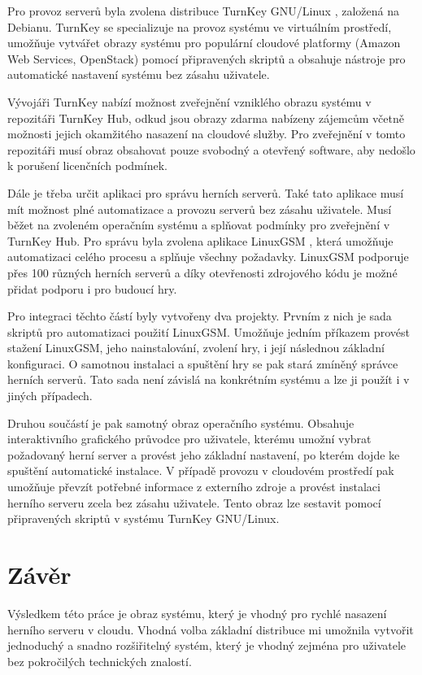 \documentclass{article}
\begin{document}
Pro provoz serverů byla zvolena distribuce TurnKey GNU/Linux \cite{turnkey}, založená na Debianu. TurnKey se specializuje na provoz systému ve virtuálním prostředí,
umožňuje vytvářet obrazy systému pro populární cloudové platformy (Amazon Web Services, OpenStack) pomocí připravených skriptů a obsahuje
nástroje pro automatické nastavení systému bez zásahu uživatele.

Vývojáři TurnKey nabízí možnost zveřejnění vzniklého obrazu systému v repozitáři TurnKey Hub, odkud jsou obrazy zdarma nabízeny zájemcům
včetně možnosti jejich okamžitého nasazení na cloudové služby. Pro zveřejnění v tomto repozitáři musí obraz obsahovat pouze svobodný a otevřený
software, aby nedošlo k porušení licenčních podmínek.

Dále je třeba určit aplikaci pro správu herních serverů. Také tato aplikace musí mít možnost plné automatizace a provozu serverů bez zásahu uživatele.
Musí běžet na zvoleném operačním systému a splňovat podmínky pro zveřejnění v TurnKey Hub. Pro správu byla zvolena aplikace LinuxGSM \cite{linuxgsm}, která umožňuje
automatizaci celého procesu a splňuje všechny požadavky. LinuxGSM podporuje přes 100 různých herních serverů a díky otevřenosti zdrojového kódu je možné přidat podporu
i pro budoucí hry.

Pro integraci těchto částí byly vytvořeny dva projekty. Prvním z nich je sada skriptů pro automatizaci použití LinuxGSM. Umožňuje jedním příkazem provést stažení LinuxGSM,
jeho nainstalování, zvolení hry, i její následnou základní konfiguraci. O samotnou instalaci a spuštění hry se pak stará zmíněný správce herních serverů.
Tato sada není závislá na konkrétním systému a lze ji použít i v jiných případech.

Druhou součástí je pak samotný obraz operačního systému. Obsahuje interaktivního grafického průvodce pro uživatele, kterému umožní vybrat požadovaný herní server a provést
jeho základní nastavení, po kterém dojde ke spuštění automatické instalace. V případě provozu v cloudovém prostředí pak umožňuje převzít potřebné informace z externího zdroje
a provést instalaci herního serveru zcela bez zásahu uživatele. Tento obraz lze sestavit pomocí připravených skriptů v systému TurnKey GNU/Linux.


\section{Závěr}
Výsledkem této práce je obraz systému, který je vhodný pro rychlé nasazení herního serveru v cloudu.
Vhodná volba základní distribuce mi umožnila vytvořit jednoduchý a snadno rozšiřitelný systém,
který je vhodný zejména pro uživatele bez pokročilých technických znalostí.
\end{document}
